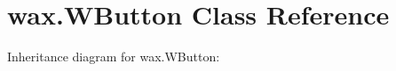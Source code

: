 \hypertarget{classwax_1_1WButton}{}\section{wax.\+W\+Button Class Reference}
\label{classwax_1_1WButton}


Inheritance diagram for wax.\+W\+Button\+:
